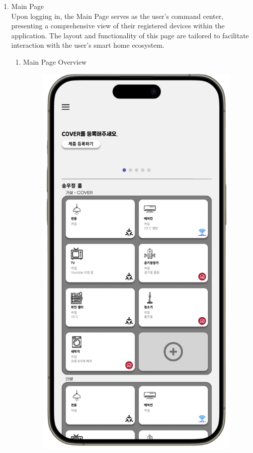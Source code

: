 \documentclass[conference]{IEEEtran}
\begin{document}
\begin{enumerate}[label=\arabic*.]
\item Main Page\\
Upon logging in, the Main Page serves as the user's command center, presenting a comprehensive view of their registered devices within the application. The layout and functionality of this page are tailored to facilitate interaction with the user's smart home ecosystem.\\
\begin{enumerate}[label=\alph*.]
\item Main Page Overview\\
\begin{figure}[H]\centering \includegraphics[scale=0.4]{images/sw-spec-2.png}\end{figure}

\end{enumerate}
\end{enumerate}
\end{document}
